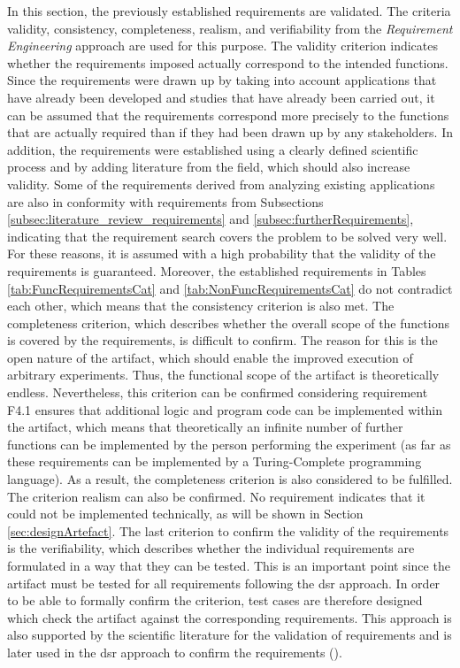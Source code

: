 In this section, the previously established requirements are validated. The criteria validity, consistency, completeness, realism, and verifiability from the \textit{Requirement Engineering} approach are used for this purpose. The validity criterion indicates whether the requirements imposed actually correspond to the intended functions. Since the requirements were drawn up by taking into account applications that have already been developed and studies that have already been carried out, it can be assumed that the requirements correspond more precisely to the functions that are actually required than if they had been drawn up by any stakeholders. In addition, the requirements were established using a clearly defined scientific process and by adding literature from the field, which should also increase validity. Some of the requirements derived from analyzing existing applications are also in conformity with requirements from Subsections \ref{subsec:literature_review_requirements} and \ref{subsec:furtherRequirements}, indicating that the requirement search covers the problem to be solved very well. For these reasons, it is assumed with a high probability that the validity of the requirements is guaranteed. Moreover, the established requirements in Tables \ref{tab:FuncRequirementsCat} and \ref{tab:NonFuncRequirementsCat} do not contradict each other, which means that the consistency criterion is also met. The completeness criterion, which describes whether the overall scope of the functions is covered by the requirements, is difficult to confirm. The reason for this is the open nature of the artifact, which should enable the improved execution of arbitrary experiments. Thus, the functional scope of the artifact is theoretically endless. Nevertheless, this criterion can be confirmed considering requirement F4.1 ensures that additional logic and program code can be implemented within the artifact, which means that theoretically an infinite number of further functions can be implemented by the person performing the experiment (as far as these requirements can be implemented by a Turing-Complete programming language). As a result, the completeness criterion is also considered to be fulfilled. The criterion realism can also be confirmed. No requirement indicates that it could not be implemented technically, as will be shown in Section \ref{sec:designArtefact}. The last criterion to confirm the validity of the requirements is the verifiability, which describes whether the individual requirements are formulated in a way that they can be tested. This is an important point since the artifact must be tested for all requirements following the \ac{dsr} approach. In order to be able to formally confirm the criterion, test cases are therefore designed which check the artifact against the corresponding requirements. This approach is also supported by the scientific literature for the validation of requirements and is later used in the \ac{dsr} approach to confirm the requirements (\cite{Sommerville.2011}).


